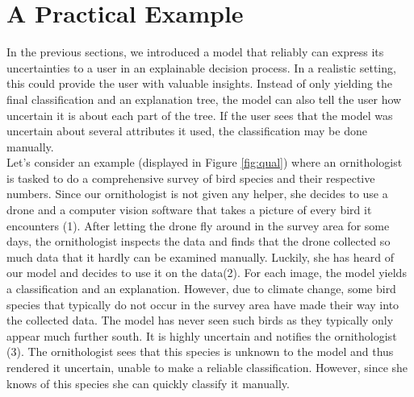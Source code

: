 \documentclass[a4paper,cleardoubleempty,BCOR1cm, 11pt]{report}
\begin{document}
\section{A Practical Example}
In the previous sections, we introduced a model that reliably can express its uncertainties to a user in an explainable decision process. In a realistic setting, this could provide the user with valuable insights. Instead of only yielding the final classification and an explanation tree, the model can also tell the user how uncertain it is about each part of the tree. If the user sees that the model was uncertain about several attributes it used, the classification may be done manually.\\
Let's consider an example (displayed in Figure \ref{fig:qual}) where an ornithologist is tasked to do a comprehensive survey of bird species and their respective numbers. Since our ornithologist is not given any helper, she decides to use a drone and a computer vision software that takes a picture of every bird it encounters (1). After letting the drone fly around in the survey area for some days, the ornithologist inspects the data and finds that the drone collected so much data that it hardly can be examined manually. Luckily, she has heard of our model and decides to use it on the data(2). For each image, the model yields a classification and an explanation. However, due to climate change, some bird species that typically do not occur in the survey area have made their way into the collected data. The model has never seen such birds as they typically only appear much further south. It is highly uncertain and notifies the ornithologist (3). The ornithologist sees that this species is unknown to the model and thus rendered it uncertain, unable to make a reliable classification. However, since she knows of this species she can quickly classify it manually.

\end{document}
